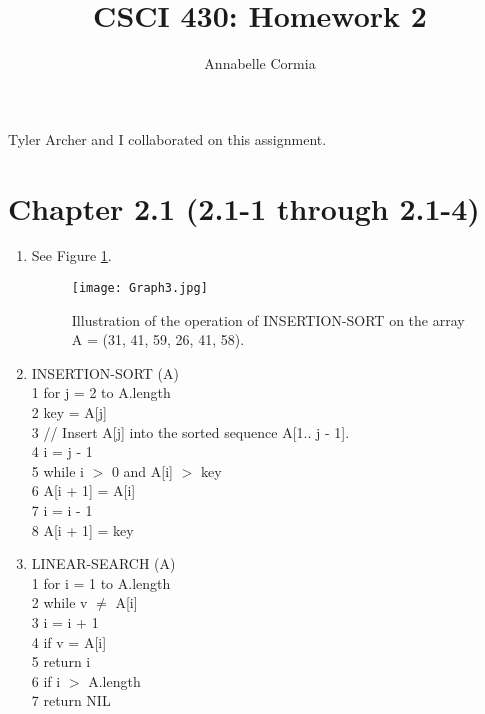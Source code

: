 \documentclass[12pt]{article}
\author{Annabelle Cormia}
\title{CSCI 430: Homework 2}
\newcommand\tab[1][1cm]{\hspace*{#1}}
\begin{document}
\maketitle

Tyler Archer and I collaborated on this assignment.\newline

\section{Chapter 2.1 (2.1-1 through 2.1-4)}

\begin{enumerate}
 
  \item See Figure \ref{figure1}.

	\begin{figure}[h!]
	\texttt{[image: Graph3.jpg]}
	\caption{Illustration of the operation of INSERTION-SORT on the array A = (31, 41, 59, 26, 41, 58).}
	\label{figure1}
	\end{figure}

  \item INSERTION-SORT (A) \\
	1 \tab	for j = 2 to A.length \\
	2 \tab \tab	key = A[j] \\
	3 \tab \tab	// Insert A[j]  into the sorted sequence A[1.. j - 1]. \\
	4 \tab \tab	 i = j - 1 \\
	5 \tab \tab	while i $>$ 0 and A[i] $>$ key \\
	6 \tab \tab \tab	 A[i + 1] = A[i] \\
	7 \tab \tab \tab	 i = i - 1 \\
	8 \tab \tab	A[i + 1] = key \\

  \item LINEAR-SEARCH (A) \\
	1 \tab for i = 1 to A.length \\
	2 \tab \tab while v $\neq$ A[i] \\
	3 \tab \tab \tab i = i + 1 \\
	4 \tab \tab if v = A[i] \\
	5 \tab \tab \tab return i \\
	6 \tab if i $>$ A.length \\
	7 \tab \tab return NIL \\


\end{enumerate}
\end{document}
